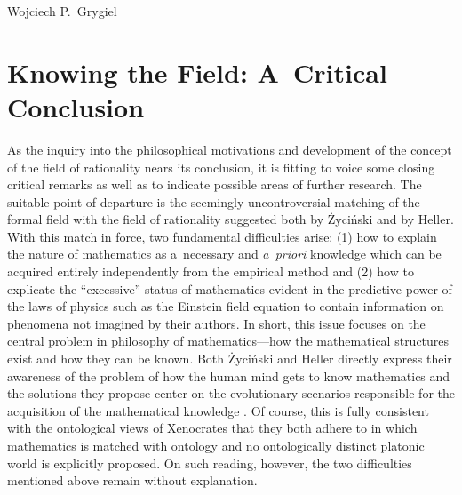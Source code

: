 \begin{artengenv}{Wojciech P.~Grygiel}
\section{Knowing the Field: A~Critical Conclusion}
As the inquiry into the philosophical motivations and development of the concept of the field of rationality nears its conclusion, it is fitting to voice some closing critical remarks as well as to indicate possible areas of further research. The suitable point of departure is the seemingly uncontroversial matching of the formal field with the field of rationality suggested both by Życiński and by Heller. With this match in force, two fundamental difficulties arise: (1) how to explain the nature of mathematics as a~necessary and \textit{a~priori} knowledge which can be acquired entirely independently from the empirical method and (2) how to explicate the ``excessive'' status of mathematics evident in the predictive power of the laws of physics such as the Einstein field equation to contain information on phenomena not imagined by their authors. In short, this issue focuses on the central problem in philosophy of mathematics—how the mathematical structures exist and how they can be known. Both Życiński and Heller directly express their awareness of the problem of how the human mind gets to know mathematics and the solutions they propose center on the evolutionary scenarios responsible for the acquisition of the mathematical knowledge
\parencites[][]{heller_co_2010}[][]{heller_jak_2010}. %
 Of course, this is fully consistent with the ontological views of Xenocrates that they both adhere to in which mathematics is matched with ontology and no ontologically distinct platonic world is explicitly proposed. On such reading, however, the two difficulties mentioned above remain without explanation.


\end{artengenv}
